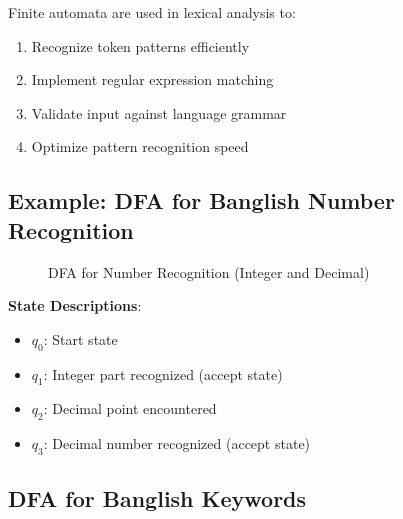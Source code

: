 \documentclass[12pt,a4paper]{article}
\begin{document}
Finite automata are used in lexical analysis to:
\begin{enumerate}
    \item Recognize token patterns efficiently
    \item Implement regular expression matching
    \item Validate input against language grammar
    \item Optimize pattern recognition speed
\end{enumerate}

\subsection{Example: DFA for Banglish Number Recognition}

\begin{figure}[H]
    \centering
    \caption{DFA for Number Recognition (Integer and Decimal)}
\end{figure}

\textbf{State Descriptions}:
\begin{itemize}
    \item \textbf{$q_0$}: Start state
    \item \textbf{$q_1$}: Integer part recognized (accept state)
    \item \textbf{$q_2$}: Decimal point encountered
    \item \textbf{$q_3$}: Decimal number recognized (accept state)
\end{itemize}

\subsection{DFA for Banglish Keywords}
\end{document}
